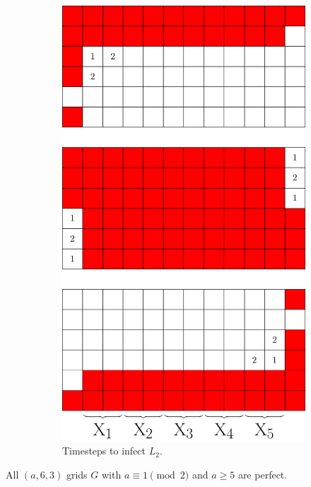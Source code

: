 \begin{figure}[]
\begin{subfigure}{0.2915\textwidth}
\includegraphics[width=\textwidth]{figures/7/6x12x3_L2_numbered_heatmap.pdf}
\caption{Timesteps to infect $L_2$.}
\label{fig:6x12x3_timesteps}
\end{subfigure}
\caption{}
\label{fig:}
\end{figure} 

\begin{con}
\label{con:3x6xodd}
All $(a,6,3)$ grids $G$ with $a \equiv 1 \pmod 2$ and $a \geq 5$ are perfect. 
\end{con}

